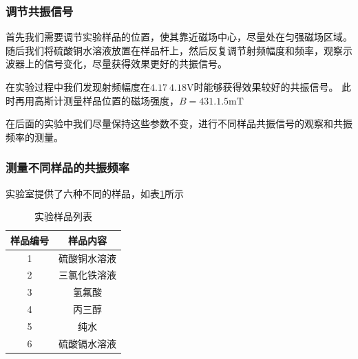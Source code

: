 \documentclass[12pt,a4paper,UTF8]{ctexart}
\begin{document}
\subsubsection*{调节共振信号}
首先我们需要调节实验样品的位置，使其靠近磁场中心，尽量处在匀强磁场区域。
随后我们将硫酸铜水溶液放置在样品杆上，然后反复调节射频幅度和频率，观察示波器上的信号变化，尽量获得效果更好的共振信号。

在实验过程中我们发现射频幅度在$4.17~4.18\mathrm{V}$时能够获得效果较好的共振信号。
此时再用高斯计测量样品位置的磁场强度，$B = 431.1.5 \mathrm{mT} $

在后面的实验中我们尽量保持这些参数不变，进行不同样品共振信号的观察和共振频率的测量。

\subsubsection*{测量不同样品的共振频率}
实验室提供了六种不同的样品，如表\ref{tab:samples}所示
\begin{table}[h!]
	\centering
	\begin{tabular}{|c|c|}
		\hline
		样品编号 & 样品内容 \\
		\hline\hline
		1 & 硫酸铜水溶液 \\
		2 & 三氯化铁溶液 \\
		3 & 氢氟酸 \\
		4 & 丙三醇 \\
		5 & 纯水 \\
		6 & 硫酸镉水溶液 \\
		\hline		
	\end{tabular}
	\caption{实验样品列表}
	\label{tab:samples}
\end{table}
\end{document}
